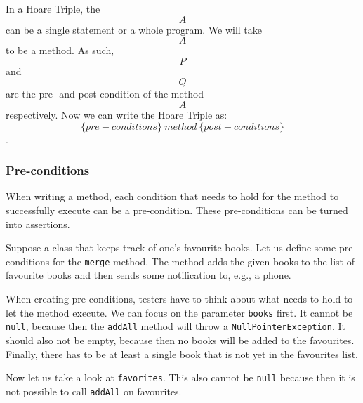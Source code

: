 In a Hoare Triple, the \[A\] can be a single statement or a whole
program. We will take \[A\] to be a method. As such, \[P\] and \[Q\] are
the pre- and post-condition of the method \[A\] respectively. Now we can
write the Hoare Triple as:
\[\{ \mathit{pre-conditions} \}\ \mathit{method}\ \{ \mathit{post-conditions} \}\].

\hypertarget{pre-conditions}{%
\subsubsection{Pre-conditions}\label{pre-conditions}}

When writing a method, each condition that needs to hold for the method
to successfully execute can be a pre-condition. These pre-conditions can
be turned into assertions.

Suppose a class that keeps track of one's favourite books. Let us define
some pre-conditions for the \texttt{merge} method. The method adds the
given books to the list of favourite books and then sends some
notification to, e.g., a phone.

\begin{Shaded}
\begin{Highlighting}[]
 
  \NormalTok{\textless{}}


    \NormalTok{(}\NormalTok{\textless{}}
\NormalTok{  \}}
\NormalTok{\}}
\end{Highlighting}
\end{Shaded}

When creating pre-conditions, testers have to think about what needs to
hold to let the method execute. We can focus on the parameter
\texttt{books} first. It cannot be \texttt{null}, because then the
\texttt{addAll} method will throw a \texttt{NullPointerException}. It
should also not be empty, because then no books will be added to the
favourites. Finally, there has to be at least a single book that is not
yet in the favourites list.

Now let us take a look at \texttt{favorites}. This also cannot be
\texttt{null} because then it is not possible to call \texttt{addAll} on
favourites.

